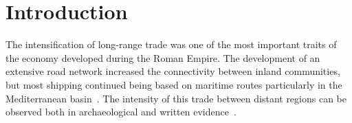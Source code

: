 \documentclass[review]{elsarticle}
\begin{document}
\begin{frontmatter}
\begin{abstract}

\end{abstract}


\end{frontmatter}


\section{Introduction}

The intensification of long-range trade was one of the most important traits of the economy developed during the Roman Empire. The development of an extensive road network increased the connectivity between inland communities, but most shipping continued being based on maritime routes particularly in the Mediterranean basin~\citep{temin_market_2001,bevan_mediterranean_2014}. The intensity of this trade between distant regions can be observed both in archaeological and written evidence~\citep{rodriguez_baetican_1998}.

\end{document}
